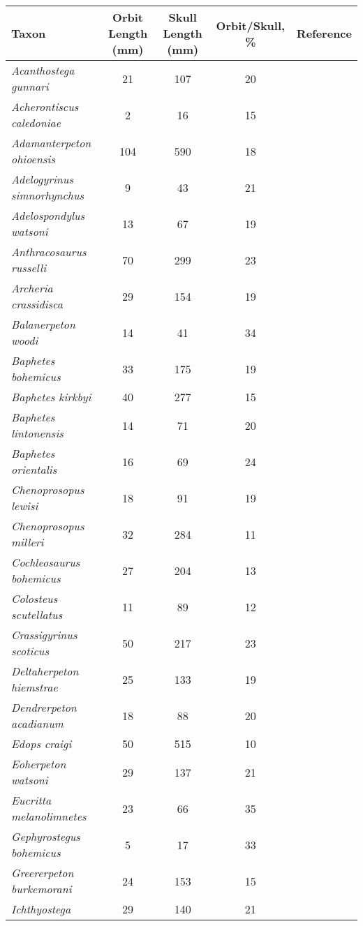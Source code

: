 \begin{tabular}{|L{4.5cm}|c|c|c|L{4.5cm}|}
\hline
\textbf{Taxon}&\textbf{Orbit Length (mm)}&\textbf{Skull Length (mm)}&\textbf{Orbit/Skull, \%}&\textbf{Reference}\\\hline
\textit{Acanthostega gunnari}&21&107&20&\\\hline
\textit{Acherontiscus caledoniae}&2&16&15&\\\hline
\textit{Adamanterpeton ohioensis}&104&590&18&\\\hline
\textit{Adelogyrinus simnorhynchus}&9&43&21&\cite{Lomb95a}\\\hline
\textit{Adelospondylus watsoni}&13&67&19&\\\hline
\textit{Anthracosaurus russelli}&70&299&23&\\\hline
\textit{Archeria crassidisca}&29&154&19&\cite{Panc85a}\\\hline
\textit{Balanerpeton woodi}&14&41&34&\cite{Bolt10a}\\\hline
\textit{Baphetes bohemicus}&33&175&19&\\\hline
\textit{Baphetes kirkbyi}&40&277&15&\\\hline
\textit{Baphetes lintonensis}&14&71&20&\\\hline
\textit{Baphetes orientalis}&16&69&24&\\\hline
\textit{Chenoprosopus lewisi}&18&91&19&\cite{Beau77a}\\\hline
\textit{Chenoprosopus milleri}&32&284&11&\cite{Clac98a}\\\hline
\textit{Cochleosaurus bohemicus}&27&204&13&\cite{Warr04a,Warr07a}\\\hline
\textit{Colosteus scutellatus}&11&89&12&\\\hline
\textit{Crassigyrinus scoticus}&50&217&23&\\\hline
\textit{Deltaherpeton hiemstrae}&25&133&19&\\\hline
\textit{Dendrerpeton acadianum}&18&88&20&\cite{Beau98a}\\\hline
\textit{Edops craigi}&50&515&10&\cite{Bent90a}\\\hline
\textit{Eoherpeton watsoni}&29&137&21&\cite{Ahlb08a}\\\hline
\textit{Eucritta melanolimnetes}&23&66&35&\\\hline
\textit{Gephyrostegus bohemicus}&5&17&33&\\\hline
\textit{Greererpeton burkemorani}&24&153&15&\\\hline
\textit{Ichthyostega}&29&140&21&\\\hline

\end{tabular}
